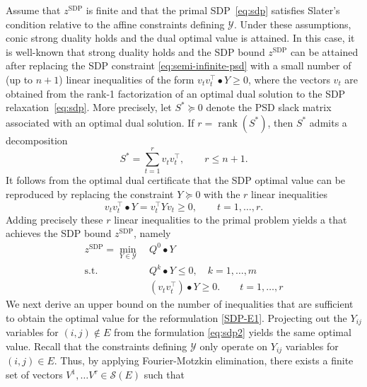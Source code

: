 \documentclass[twoside]{article}
\newcommand{\R}{\mathbb{R}}
\newcommand{\matip}[2]{#1 \bullet #2}
\newcommand{\citep}[1]{\cite{#1}}
\begin{document}
	Assume that $z^{\mathrm{SDP}}$ is finite and that the primal SDP~\eqref{eq:sdp} satisfies Slater's condition relative to the affine constraints defining $\mathcal Y$.
	Under these assumptions, conic strong duality holds and the dual optimal value is attained.  In this case, it is well-known that \citep{ramana1997exact,vandenberghe1996semidefinite,deroux.carr.ravi:25} strong duality holds and the SDP bound $z^{\text{SDP}}$ can be attained after replacing the SDP constraint \eqref{eq:semi-infinite-psd} with a small number of (up to $n+1$) linear inequalities of the form $\matip{v_t v_t^\top}{Y} \geq 0$,
	where the vectors $v_t$ are obtained from the rank-1 factorization of an optimal dual solution to the SDP relaxation~\eqref{eq:sdp}. %
	More precisely, let $S^*\succeq0$ denote the PSD slack matrix associated with an optimal dual solution. If $r=\operatorname{rank}(S^*)$, then $S^*$ admits a decomposition
	\[
	S^*=\sum_{t=1}^r v_tv_t^\top,
	\qquad r\leq n+1.
	\]
	It follows from the optimal dual certificate that the SDP optimal value can be reproduced by replacing the constraint $Y\succeq0$ with the $r$ linear inequalities
	\[
	\matip{v_tv_t^\top}{Y}=v_t^\top Yv_t\geq0, \qquad t=1,\ldots,r.
	\]
	Adding precisely these $r$ linear inequalities to the primal problem yields a \LP that achieves the SDP bound $z^{\text{SDP}}$, namely
	\begin{subequations}
		\label{eq:sdp2}
		\begin{align}
			z^{\text{SDP}}= \min_{Y \in \mathcal{Y}} \ & \matip{Q^0}{Y}  \\
			\text{s.t. } &\matip{Q^k}{Y}  \leq 0, \quad k=1,\ldots, m  \label{eq:sdp2-cons} \\
			& \matip{ (v_tv_t^\top) }{Y} \geq 0. \qquad t=1,\ldots, r  \label{eq:sdp2-dual-eigen}
		\end{align}
	\end{subequations}
	We next derive an upper bound on the number of inequalities that are sufficient to obtain the optimal value for the reformulation \eqref{SDP-E1}. Projecting out the $Y_{ij}$ variables for $(i,j) \not\in E$ from the formulation \eqref{eq:sdp2} yields the same optimal value.
	Recall that the constraints defining $\mathcal{Y}$ only operate on $Y_{ij}$ variables for $(i,j) \in E$. Thus, by applying Fourier-Motzkin elimination, there exists a finite set of vectors $V^1, \ldots V^\tau \in \mathcal{S}(E)$ such that 
\end{document}
